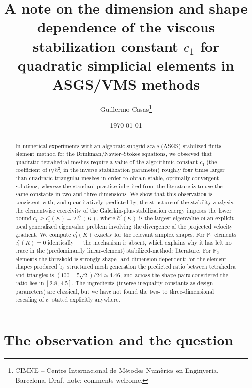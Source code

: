 \documentclass[11pt,a4paper]{article}
\title{A note on the dimension and shape dependence of the viscous
stabilization constant $c_1$ for quadratic simplicial elements in
ASGS/VMS methods}
\author{Guillermo Casas\thanks{CIMNE -- Centre Internacional de M\`etodes
Num\`erics en Enginyeria, Barcelona. Draft note; comments welcome.}}
\date{\today}
\theoremstyle{remark}
\newcommand{\PP}{\mathbb{P}}
\newcommand{\chat}{\hat{c}}
\begin{document}
\maketitle

\begin{abstract}
In numerical experiments with an algebraic subgrid-scale (ASGS)
stabilized finite element method for the Brinkman/Navier--Stokes
equations, we observed that quadratic tetrahedral meshes require a
value of the algorithmic constant $c_1$ (the coefficient of
$\nu/h_K^2$ in the inverse stabilization parameter) roughly four times
larger than quadratic triangular meshes in order to obtain stable,
optimally convergent solutions, whereas the standard practice inherited
from the literature is to use the same constants in two and three
dimensions. We show that this observation is consistent with, and
quantitatively predicted by, the structure of the stability analysis:
the elementwise coercivity of the Galerkin-plus-stabilization energy
imposes the lower bound $c_1 \ge c_1^*(K) = 2\,\chat^2(K)$, where
$\chat^2(K)$ is the largest eigenvalue of an explicit local
generalized eigenvalue problem involving the divergence of the
projected velocity gradient. We compute $c_1^*(K)$ exactly for the
relevant simplex shapes. For $\PP_1$ elements $c_1^*(K)=0$ identically
--- the mechanism is absent, which explains why it has left no trace in
the (predominantly linear-element) stabilized-methods literature. For
$\PP_2$ elements the threshold is strongly shape- and
dimension-dependent; for the element shapes produced by structured
mesh generation the predicted ratio between tetrahedra and triangles is
$(100+5\sqrt{2})/24 \approx 4.46$, and across the shape pairs
considered the ratio lies in $[2.8,\,4.5]$. The ingredients
(inverse-inequality constants as design parameters) are classical, but
we have not found the two- to three-dimensional rescaling of $c_1$
stated explicitly anywhere.
\end{abstract}

\section{The observation and the question}
\label{sec:observation}
\end{document}
